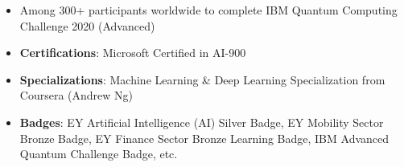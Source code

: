 \documentclass[a4paper,10pt]{article}
\begin{document}
\begin{itemize}
\item Among 300+ participants worldwide to complete IBM Quantum Computing Challenge 2020 (Advanced)

\item \textbf{Certifications}: Microsoft Certified in AI-900
\item \textbf{Specializations}: Machine Learning \& Deep Learning Specialization from Coursera (Andrew Ng)
\item \textbf{Badges}: EY Artificial Intelligence (AI) Silver Badge, EY Mobility Sector Bronze Badge, EY Finance Sector Bronze Learning Badge, IBM Advanced Quantum Challenge Badge, etc.
    
	
\end{itemize}
\end{document}
